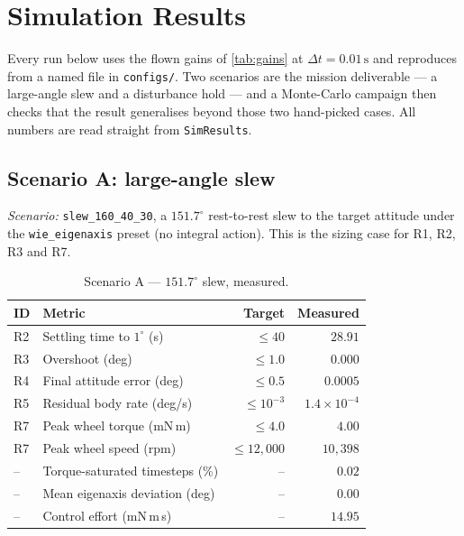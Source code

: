 \documentclass[conference,10pt,a4paper]{IEEEtran}
\newcommand{\unit}[1]{\ensuremath{\,\mathrm{#1}}}
\begin{document}
\section{Simulation Results}
\label{sec:results}

Every run below uses the flown gains of \cref{tab:gains} at
$\Delta t=0.01\unit{s}$ and reproduces from a named file in
\texttt{configs/}. Two scenarios are the mission deliverable --- a large-angle
slew and a disturbance hold --- and a Monte-Carlo campaign then checks that the
result generalises beyond those two hand-picked cases. All numbers are read
straight from \texttt{SimResults}.

\subsection{Scenario A: large-angle slew}
\label{sec:scenarioA}

\textit{Scenario:} \texttt{slew\_160\_40\_30}, a $151.7^\circ$ rest-to-rest
slew to the target attitude under the \texttt{wie\_eigenaxis} preset (no
integral action). This is the sizing case for R1, R2, R3 and R7.

\begin{table}[!t]
\centering
\caption{Scenario A --- $151.7^\circ$ slew, measured.}
\label{tab:results_slew}
\footnotesize
\begin{tabular}{@{}llrr@{}}
\toprule
\textbf{ID} & \textbf{Metric} & \textbf{Target} & \textbf{Measured} \\
\midrule
R2 & Settling time to $1^\circ$ (s)  & $\le40$    & $28.91$ \\
R3 & Overshoot (deg)                 & $\le1.0$   & $0.000$ \\
R4 & Final attitude error (deg)      & $\le0.5$   & $0.0005$ \\
R5 & Residual body rate (deg/s)      & $\le10^{-3}$ & $1.4\times10^{-4}$ \\
R7 & Peak wheel torque (mN\,m)       & $\le4.0$   & $4.00$ \\
R7 & Peak wheel speed (rpm)          & $\le12{,}000$ & $10{,}398$ \\
-- & Torque-saturated timesteps (\%) & --         & $0.02$ \\
-- & Mean eigenaxis deviation (deg)  & --         & $0.00$ \\
-- & Control effort (mN\,m\,s)       & --         & $14.95$ \\
\bottomrule
\end{tabular}
\end{table}
\end{document}
